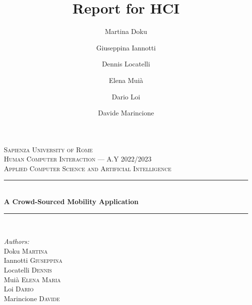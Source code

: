 \documentclass[a4paper, 11pt]{report}
\author{Martina Doku \and Giuseppina Iannotti \and Dennis Locatelli \and Elena Muià \and Dario Loi \and Davide Marincione}
\title{\Huge Report for HCI} %
\begin{document}
\begin{titlepage} %
	\newcommand{\HRule}{\rule{\linewidth}{0.5mm}} %

	\center%


	\textsc{\LARGE Sapienza University of Rome}\\[1.5cm] %

	\textsc{\Large Human Computer Interaction --- A.Y 2022/2023}\\[0.5cm] %

	\textsc{\large Applied Computer Science and Artificial Intelligence}\\[0.5cm] %


	\HRule\\[0.4cm]

	{\huge\bfseries A Crowd-Sourced Mobility Application}\\[0.4cm] %

	\HRule\\[1.5cm]


	\begin{minipage}{0.4\textwidth}
		\begin{flushleft}
			\Large
			\textit{Authors:}\\[3pt]\hspace{2pt} %
			Doku \textsc{Martina}\\[1pt]\hspace{2pt}
			Iannotti \textsc{Giuseppina}\\[1pt]\hspace{2pt}
			Locatelli \textsc{Dennis}\\[1pt]\hspace{2pt}
			Muià \textsc{Elena Maria}\\[1pt]\hspace{2pt}
			Loi \textsc{Dario}\\[1pt]\hspace{2pt}
			Marincione \textsc{Davide}
		\end{flushleft}
	\end{minipage}
	\begin{minipage}{0.4\textwidth}
		\begin{flushright}
		\end{flushright}
	\end{minipage}


\end{titlepage}
\end{document}

